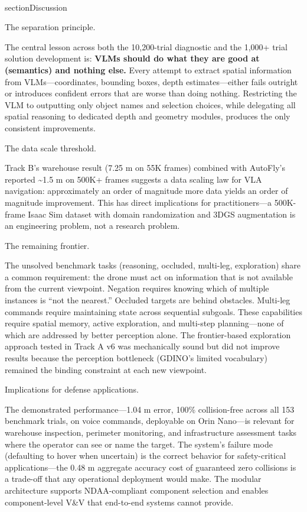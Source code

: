 \documentclass[conference]{IEEEtran}
\begin{document}
\\section{Discussion}\label{ix.-discussion}

The separation principle.

The central lesson across both the 10,200-trial diagnostic and the
1,000+ trial solution development is: \textbf{VLMs should do what they
are good at (semantics) and nothing else.} Every attempt to extract
spatial information from VLMs---coordinates, bounding boxes, depth
estimates---either fails outright or introduces confident errors that
are worse than doing nothing. Restricting the VLM to outputting only
object names and selection choices, while delegating all spatial
reasoning to dedicated depth and geometry modules, produces the only
consistent improvements.

The data scale threshold.

Track B's warehouse result (7.25 m on 55K frames) combined with
AutoFly's reported \textasciitilde1.5 m on 500K+ frames suggests a data
scaling law for VLA navigation: approximately an order of magnitude more
data yields an order of magnitude improvement. This has direct
implications for practitioners---a 500K-frame Isaac Sim dataset with
domain randomization and 3DGS augmentation is an engineering problem,
not a research problem.

The remaining frontier.

The unsolved benchmark tasks (reasoning, occluded, multi-leg,
exploration) share a common requirement: the drone must act on
information that is not available from the current viewpoint. Negation
requires knowing which of multiple instances is ``not the nearest.''
Occluded targets are behind obstacles. Multi-leg commands require
maintaining state across sequential subgoals. These capabilities require
spatial memory, active exploration, and multi-step planning---none of
which are addressed by better perception alone. The frontier-based
exploration approach tested in Track A v6 was mechanically sound but did
not improve results because the perception bottleneck (GDINO's limited
vocabulary) remained the binding constraint at each new viewpoint.

Implications for defense applications.

The demonstrated performance---1.04 m error, 100\% collision-free across
all 153 benchmark trials, on voice commands, deployable on Orin
Nano---is relevant for warehouse inspection, perimeter monitoring, and
infrastructure assessment tasks where the operator can see or name the
target. The system's failure mode (defaulting to hover when uncertain)
is the correct behavior for safety-critical applications---the 0.48 m
aggregate accuracy cost of guaranteed zero collisions is a trade-off
that any operational deployment would make. The modular architecture
supports NDAA-compliant component selection and enables component-level
V\&V that end-to-end systems cannot provide.
\end{document}

